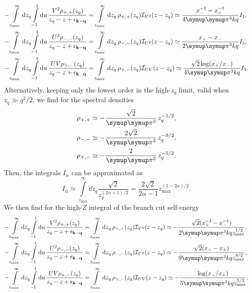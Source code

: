 \documentclass[10pt,a4paper]{article}
\let\canpi\pi
\renewcommand\pi{\symup\canpi}%
\newcommand{\epskq}{\ensuremath{\epsilon_{\vb{k}-\vb{q}}}}
\begin{document}
\begin{align}
    -\int\limits_{z_\mathrm{max}}^{\infty} \dd{z_q} \int\limits_{-1}^1 \dd{u} \frac{V^2 \rho_{+,+}(z_q)}{z_q-z+\epskq}
    &=\int\limits_{z_\mathrm{max}}^{\infty} \dd{z_q} \rho_{+,+}(z_q) \mathcal{I}_{V^2}(z-z_q) 
    \simeq \frac{x_-^{-1} - x_+^{-1}}{4\pi^3 kq} I_1,\\
    -\int\limits_{z_\mathrm{max}}^{\infty} \dd{z_q} \int\limits_{-1}^1 \dd{u} \frac{U^2 \rho_{-,-}(z_q)}{z_q-z+\epskq}
    &=\int\limits_{z_\mathrm{max}}^{\infty} \dd{z_q} \rho_{-,-}(z_q) \mathcal{I}_{U^2}(z-z_q) 
    \simeq \frac{x_+ - x_-}{2\pi^3 kq} I_5, \\
    -\int\limits_{z_\mathrm{max}}^{\infty} \dd{z_q} \int\limits_{-1}^1 \dd{u} \frac{UV \rho_{+,-}(z_q)}{z_q-z+\epskq}
    &=\int\limits_{z_\mathrm{max}}^{\infty} \dd{z_q} \rho_{+,-}(z_q) \mathcal{I}_{UV}(z-z_q) 
    \simeq \frac{\sqrt{2} \log(x_+/x_-)}{4\pi^3 kq} I_3.
\end{align}
Alternatively, keeping only the lowest order in the high-$z_q$ limit, valid when $z_q\gg q^2/2$, we find for the spectral densities 
\begin{align}
    \rho_{+,+} &\simeq -\frac{\sqrt{2}}{\pi^3} \, z_q^{-1/2}, \\
    \rho_{-,-} &\simeq -\frac{2\sqrt{2}}{\pi^3} \, z_q^{-9/2}, \\
    \rho_{+,-} &\simeq -\frac{2}{\pi^3} \, z_q^{-5/2}.
\end{align}
Then, the integrals $I_\alpha$ can be approximated as 
\begin{equation}
    I_\alpha \simeq \int\limits_{z_\mathrm{max}}^{\infty} \dd{z_q} \frac{\sqrt{2}}{z_q^{(2\alpha+1)/2}} = \frac{2 \sqrt{2}}{2\alpha-1} z_\mathrm{max}^{(1-2\alpha)/2}.
\end{equation}
We then find for the high-$Z$ integral of the branch cut self-energy
\begin{align}
    -\int\limits_{z_\mathrm{max}}^{\infty} \dd{z_q} \int\limits_{-1}^1 \dd{u} \frac{V^2 \rho_{+,+}(z_q)}{z_q-z+\epskq}
    &=\int\limits_{z_\mathrm{max}}^{\infty} \dd{z_q} \rho_{+,+}(z_q) \mathcal{I}_{V^2}(z-z_q) 
    \simeq -\frac{\sqrt{2}(x_+^{-1} - x_-^{-1})}{2\pi^3 kq z_\mathrm{max}^{1/2}},\\
    -\int\limits_{z_\mathrm{max}}^{\infty} \dd{z_q} \int\limits_{-1}^1 \dd{u} \frac{U^2 \rho_{-,-}(z_q)}{z_q-z+\epskq}
    &=\int\limits_{z_\mathrm{max}}^{\infty} \dd{z_q} \rho_{-,-}(z_q) \mathcal{I}_{U^2}(z-z_q) 
    \simeq -\frac{\sqrt{2}(x_- - x_+)}{9\pi^3 kq z_\mathrm{max}^{9/2}}, \\
    -\int\limits_{z_\mathrm{max}}^{\infty} \dd{z_q} \int\limits_{-1}^1 \dd{u} \frac{UV \rho_{+,-}(z_q)}{z_q-z+\epskq}
    &=\int\limits_{z_\mathrm{max}}^{\infty} \dd{z_q} \rho_{+,-}(z_q) \mathcal{I}_{UV}(z-z_q) 
    \simeq -\frac{\log(x_-/x_+)}{5\pi^3 kq z_\mathrm{max}^{5/2}}.
\end{align}
\end{document}
